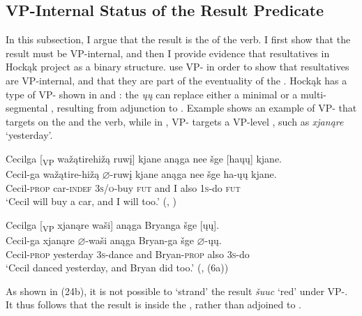 \documentclass[output=paper]{LSP/langsci}
\begin{document}
\subsection{VP-Internal Status of the Result Predicate}\label{sec:rosen:3.2}

In this subsection, I argue that the result  is the  of the verb. I first show that the result  must be VP-internal, and then I provide evidence that resultatives in Hockąk project as a binary structure. \citet{LevinRappaportHovav1995} use VP- in order to show that resultatives are VP-internal, and that they are part of the eventuality of the . Hockąk has a type of VP- shown in  and : the  \textit{ųų} can replace either a minimal  or a multi-segmental , resulting from adjunction to . Example  shows an example of VP- that targets on the  and the verb, while in , VP- targets a VP-level , such as \textit{xjanąre} `yesterday'.

\begin{exe}
\ex \label{ex:rosen:22}
\glll Cecilga [\textsubscript{VP} wažątirehižą ruwį] kjane anąga nee šge [haųų] kjane.\\
Cecil-ga {} wažątire-hižą {$\varnothing$}-ruwį kjane anąga nee šge ha-ųų kjane.\\
Cecil-\textsc{prop} {} car-\textsc{indef} \textsc{3s/o}-buy \textsc{fut} and I also \textsc{1s}-do \textsc{fut}\\
\glt `Cecil will buy a car, and I will too.' (\citealt{Johnson2013}, )

\ex \label{ex:rosen:23}
\glll Cecilga [\textsubscript{VP} xjanąre waši] anąga Bryanga šge [ųų].\\
Cecil-ga {} xjanąre {$\varnothing$}-waši anąga Bryan-ga šge {$\varnothing$}-ųų.\\
Cecil-\textsc{prop} {} yesterday \textsc{3s}-dance and Bryan-\textsc{prop} also \textsc{3s}-do\\
\glt `Cecil danced yesterday, and Bryan did too.' (\citealt{Johnson2013}, (6a))

\end{exe}

As shown in (24b), it is not possible to `strand' the result  \textit{šuuc} `red' under VP-. It thus follows that the result is inside the , rather than adjoined to .
\end{document}
